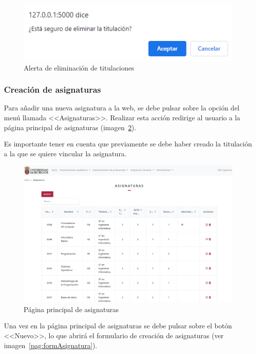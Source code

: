 \begin{figure}
	\centering
	\includegraphics[width=\textwidth]{../img/Anexos/Manual usuario/alertElTitulacion.png}
	\caption{Alerta de eliminación de titulaciones}\label{pag:alertElTitulacion}
\end{figure}

\subsubsection{Creación de asignaturas}
Para añadir una nueva asignatura a la web, se debe pulsar sobre la opción del menú llamada <<Asignaturas>>.
Realizar esta acción redirige al usuario a la página principal de asignaturas (imagen~\ref{pag:asignaturas}).

Es importante tener en cuenta que previamente se debe haber creado la titulación a la que se quiere vincular la asignatura.

\begin{figure}
	\centering
	\includegraphics[width=\textwidth]{../img/Anexos/Manual usuario/asignaturas.png}
	\caption{Página principal de asignaturas}\label{pag:asignaturas}
\end{figure}

Una vez en la página principal de asignaturas se debe pulsar sobre el botón <<Nuevo>>, lo que abrirá el formulario de creación de asignaturas (ver imagen~\ref{pag:formAsignatura}).


